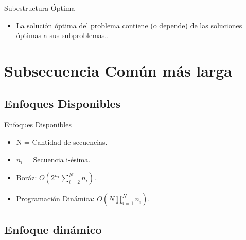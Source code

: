 \documentclass{beamer}
\begin{document}
		\begin{frame}{Subestructura Óptima}
 			\begin{itemize}
			
  				\item La solución óptima del problema contiene (o depende) de las soluciones óptimas a sus subproblemas..

			\end{itemize}
		\end{frame}
			

	\section{Subsecuencia Común más larga}

		\subsection{Enfoques Disponibles}
	
			\begin{frame}{Enfoques Disponibles}
 			
				\begin{itemize}
			
					\item N = Cantidad de secuencias.
				
					\item $n_{i} $ = Secuencia i-ésima.

  					\item Boráz: $O(2^{n_{1}}\sum_{i = 2}^{N}n_{i})$.
  			
					\item Programación Dinámica: $O(N\prod_{i = 1}^{N}n_{i})$.
  					
				\end{itemize}
			
			\end{frame}

		\subsection{Enfoque dinámico}
		
\end{document}
